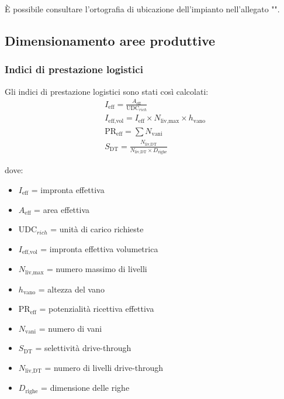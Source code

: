 \documentclass[11pt]{article}
\begin{document}
È possibile consultare l'ortografia di ubicazione dell'impianto nell'allegato "".
\newpage

\subsection{Dimensionamento aree produttive}
\subsubsection{Indici di prestazione logistici}
Gli indici di prestazione logistici sono stati così calcolati:
\begin{align*}
    & I_\text{eff} = \frac{A_\text{eff}}{\text{UDC}_{rich}} \\
    & I_\text{eff,vol} = I_\text{eff} \times N_\text{liv,max} \times h_\text{vano} \\
    & \text{PR}_\text{eff} = \sum N_\text{vani} \\
    & S_\text{DT} = \frac{N_\text{liv,DT}}{N_\text{liv,DT} \times D_\text{righe}}
\end{align*}

\noindent
dove:
\begin{itemize}
    \item $I_\text{eff}$ = impronta effettiva
    \item $A_\text{eff}$ = area effettiva
    \item $\text{UDC}_{rich}$ = unità di carico richieste
    \item $I_\text{eff,vol}$ = impronta effettiva volumetrica
    \item $N_\text{liv,max}$ = numero massimo di livelli
    \item $h_\text{vano}$ = altezza del vano
    \item $\text{PR}_\text{eff}$ = potenzialità ricettiva effettiva
    \item $N_\text{vani}$ = numero di vani
    \item $S_\text{DT}$ = selettività drive-through
    \item $N_\text{liv,DT}$ = numero di livelli drive-through
    \item $D_\text{righe}$ = dimensione delle righe
\end{itemize}
\end{document}
